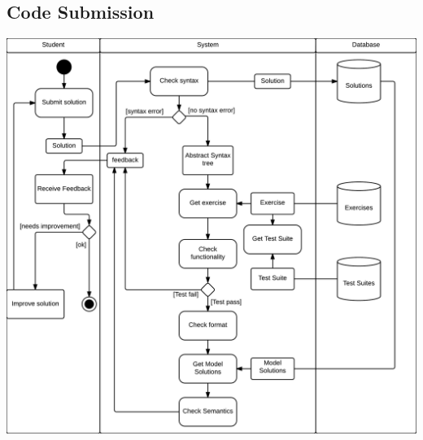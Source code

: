 \subsection{Code Submission}
\includegraphics[scale=0.8]{diagrams-images/code-submission-activity-diagram}